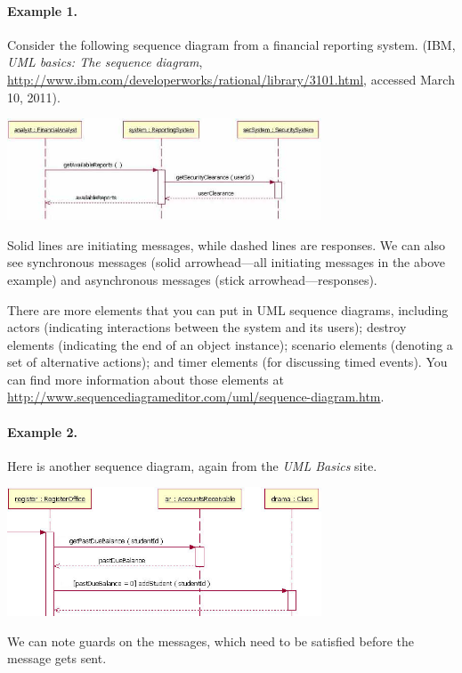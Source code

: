 \paragraph{Example 1.} Consider the following sequence diagram from
a financial reporting system. (IBM, \emph{UML basics: The sequence
  diagram},
\url{http://www.ibm.com/developerworks/rational/library/3101.html},
accessed March 10, 2011).

\begin{center}
\includegraphics[width=0.7\textwidth]{images/uml_sequence.png}
\end{center}
Solid lines are initiating messages, while dashed lines are responses.
We can also see synchronous messages (solid arrowhead---all initiating
messages in the above example) and asynchronous messages (stick
arrowhead---responses).

There are more elements that you can put in UML sequence diagrams,
including actors (indicating interactions between the system and
its users); destroy elements (indicating the end of an object
instance); scenario elements (denoting a set of alternative actions);
and timer elements (for discussing timed events). You can find
more information about those elements at \url{http://www.sequencediagrameditor.com/uml/sequence-diagram.htm}.

\paragraph{Example 2.} Here is another sequence diagram, again from the
\emph{UML Basics} site.
\begin{center}
\includegraphics[width=0.7\textwidth]{images/student_records.png}
\end{center}
We can note guards on the messages, which need to be satisfied before
the message gets sent.

